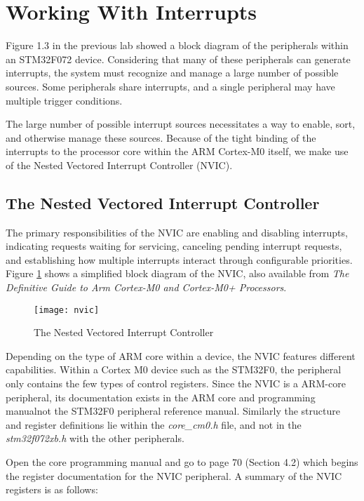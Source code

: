 \documentclass[11pt,fleqn]{book} %
\begin{document}
\section{Working With Interrupts}
Figure 1.3 in the previous lab showed a block diagram of the peripherals within an STM32F072 device. Considering that many of these peripherals can generate interrupts, the system must recognize and manage a large number of possible sources. Some peripherals share interrupts, and a single peripheral may have multiple trigger conditions.  

The large number of possible interrupt sources necessitates a way to enable, sort, and otherwise manage these sources. Because of the tight binding of the interrupts to the processor core within the ARM Cortex-M0 itself, we make use of the Nested Vectored Interrupt Controller (NVIC).

\subsection{\color{orange}The Nested Vectored Interrupt Controller}
The primary responsibilities of the NVIC are enabling and disabling interrupts, indicating requests waiting for servicing, canceling pending interrupt requests, and establishing how multiple interrupts interact through configurable priorities. Figure \ref{nvic} shows a simplified block diagram of the NVIC, also available from \textit{The Definitive Guide to Arm Cortex-M0 and Cortex-M0+ Processors}.
    
\begin{figure}[h]
    \centering\texttt{[image: nvic]}
    \caption{The Nested Vectored Interrupt Controller}
    \label{nvic}
\end{figure}

Depending on the type of ARM core within a device, the NVIC features different capabilities. Within a Cortex M0 device such as the STM32F0, the peripheral only contains the few types of control registers. Since the NVIC is a ARM-core peripheral, its documentation exists in the ARM core and programming manual\textemdash not the STM32F0 peripheral reference manual. Similarly the structure and register definitions lie within the \textit{core\_cm0.h} file, and not in the \textit{stm32f072xb.h} with the other peripherals.  

Open the core programming manual and go to page 70 (Section 4.2) which begins the register documentation for the NVIC peripheral. A summary of the NVIC registers is as follows:
\end{document}
